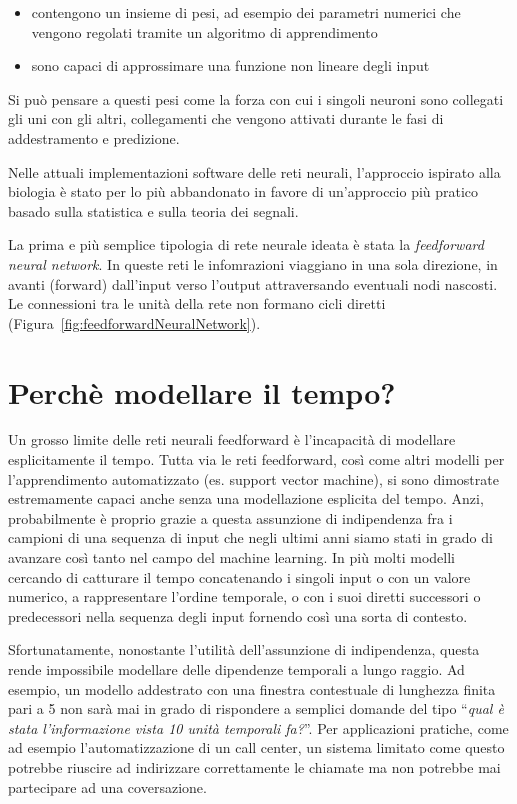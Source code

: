\begin{itemize}
  \item contengono un insieme di pesi, ad esempio dei parametri numerici che vengono regolati tramite un algoritmo di apprendimento
  \item sono capaci di approssimare una funzione non lineare degli input
\end{itemize}

Si pu\`o pensare a questi pesi come la forza con cui i singoli neuroni sono collegati gli uni con gli altri, collegamenti che vengono attivati durante le fasi di addestramento e predizione.

Nelle attuali implementazioni software delle reti neurali, l'approccio ispirato alla biologia \`e stato per lo pi\`u abbandonato in favore di un'approccio pi\`u pratico basado sulla statistica e sulla teoria dei segnali.

La prima e pi\`u semplice tipologia di rete neurale ideata \`e stata la \emph{feedforward neural network}.
In queste reti le infomrazioni viaggiano in una sola direzione, in avanti (forward) dall'input verso l'output attraversando eventuali nodi nascosti.
Le connessioni tra le unit\`a della rete non formano cicli diretti (Figura~\ref{fig:feedforwardNeuralNetwork}).

\section{Perch\`e modellare il tempo?} %
Un grosso limite delle reti neurali feedforward \`e l'incapacit\`a di modellare esplicitamente il tempo.
Tutta via le reti feedforward, cos\`i come altri modelli per l'apprendimento automatizzato (es. support vector machine), si sono dimostrate estremamente capaci anche senza una modellazione esplicita del tempo.
Anzi, probabilmente \`e proprio grazie a questa assunzione di indipendenza fra i campioni di una sequenza di input che negli ultimi anni siamo stati in grado di avanzare cos\`i tanto nel campo del machine learning.
In pi\`u molti modelli cercando di catturare il tempo concatenando i singoli input o con un valore numerico, a rappresentare l'ordine temporale, o con i suoi diretti successori o predecessori nella sequenza degli input fornendo cos\`i una sorta di contesto.

Sfortunatamente, nonostante l'utilit\`a dell'assunzione di indipendenza, questa rende impossibile modellare delle dipendenze temporali a lungo raggio.
Ad esempio, un modello addestrato con una finestra contestuale di lunghezza finita pari a 5 non sar\`a mai in grado di rispondere a semplici domande del tipo ``\emph{qual \`e stata l'informazione vista 10 unit\`a temporali fa?}''.
Per applicazioni pratiche, come ad esempio l'automatizzazione di un call center, un sistema limitato come questo potrebbe riuscire ad indirizzare correttamente le chiamate ma non potrebbe mai partecipare ad una coversazione.

